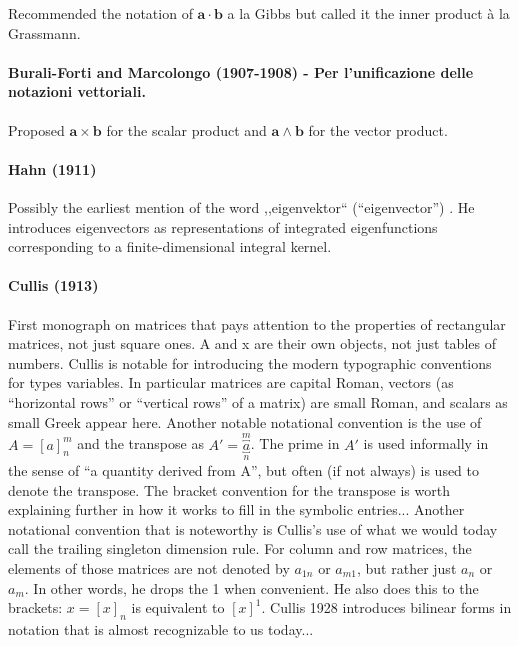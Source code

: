 Recommended the notation of $\mathbf{a} \cdot \mathbf{b}$ a la Gibbs but called it the inner product à la Grassmann.



\paragraph{Burali-Forti and Marcolongo (1907-1908) - Per l’unificazione delle notazioni vettoriali.}

Proposed $\mathbf{a}\times\mathbf{b}$ for the scalar product and  $\mathbf{a}\wedge\mathbf{b}$ for the vector product.



\paragraph{Hahn (1911)~\cite{Hahn1911}}

Possibly the earliest mention of the word ,,eigenvektor`` (``eigenvector'') \cite[p. 35]{Hahn1911}.
He introduces eigenvectors as representations of integrated eigenfunctions corresponding to a finite-dimensional integral kernel.



\paragraph{Cullis (1913)}

First monograph on matrices that pays attention to the properties of rectangular matrices, not just square ones.
A and x are their own objects, not just tables of numbers.
Cullis is notable for introducing the modern typographic conventions for types variables. In particular matrices are capital Roman, vectors (as ``horizontal rows'' or ``vertical rows'' of a matrix) are small Roman, and scalars as small Greek appear here.
Another notable notational convention is the use of $A = [a]^m_n$ and the transpose as $A' = \overbracket{\underbracket{a}}^m_n$. The prime in $A'$ is used informally in the sense of ``a quantity derived from A'', but often (if not always) is used to denote the transpose.
The bracket convention for the transpose is worth explaining further in how it works to fill in the symbolic entries...
Another notational convention that is noteworthy is Cullis's use of what we would today call the trailing singleton dimension rule. For column and row matrices, the elements of those matrices are not denoted by $a_{1n}$ or $a_{m1}$, but rather just $a_n$ or $a_m$. In other words, he drops the 1 when convenient. He also does this to the brackets: $x = [x]_n$ is equivalent to $[x]^1$.
Cullis 1928 introduces bilinear forms in notation that is almost recognizable to us today...



